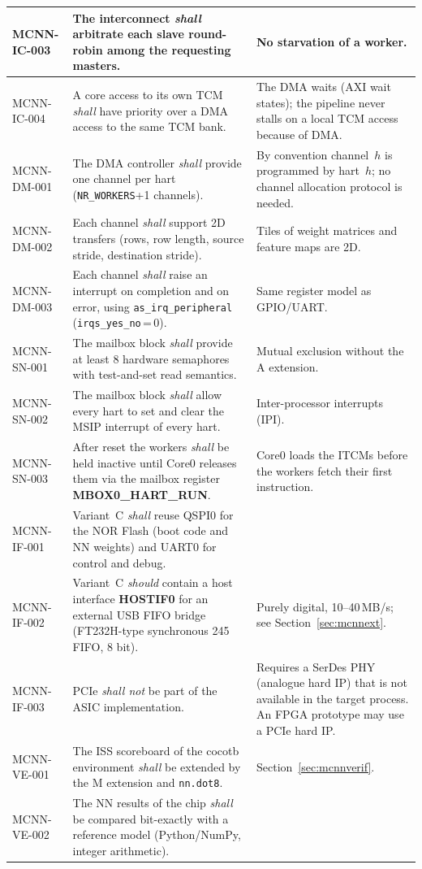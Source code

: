 \begin{longtable}{|p{} |p{} |p{}|}
  \hline
  MCNN-IC-003 &
    The interconnect \textit{shall} arbitrate each slave round-robin among
    the requesting masters. &
    No starvation of a worker. \\
  \hline
  MCNN-IC-004 &
    A core access to its own TCM \textit{shall} have priority over a DMA
    access to the same TCM bank. &
    The DMA waits (AXI wait states); the pipeline never stalls on a local
    TCM access because of DMA. \\
  \hline
  MCNN-DM-001 &
    The DMA controller \textit{shall} provide one channel per hart
    (\texttt{NR\_WORKERS}+1 channels). &
    By convention channel~$h$ is programmed by hart~$h$; no channel
    allocation protocol is needed. \\
  \hline
  MCNN-DM-002 &
    Each channel \textit{shall} support 2D transfers (rows, row length,
    source stride, destination stride). &
    Tiles of weight matrices and feature maps are 2D. \\
  \hline
  MCNN-DM-003 &
    Each channel \textit{shall} raise an interrupt on completion and on
    error, using \texttt{as\_irq\_peripheral} (\texttt{irqs\_yes\_no}\,=\,0). &
    Same register model as GPIO/UART. \\
  \hline
  MCNN-SN-001 &
    The mailbox block \textit{shall} provide at least 8 hardware
    semaphores with test-and-set read semantics. &
    Mutual exclusion without the A extension. \\
  \hline
  MCNN-SN-002 &
    The mailbox block \textit{shall} allow every hart to set and clear the
    MSIP interrupt of every hart. &
    Inter-processor interrupts (IPI). \\
  \hline
  MCNN-SN-003 &
    After reset the workers \textit{shall} be held inactive until Core0
    releases them via the mailbox register \textbf{MBOX0\_HART\_RUN}. &
    Core0 loads the ITCMs before the workers fetch their first
    instruction. \\
  \hline
  MCNN-IF-001 &
    Variant~C \textit{shall} reuse QSPI0 for the NOR Flash (boot code and
    NN weights) and UART0 for control and debug. & \\
  \hline
  MCNN-IF-002 &
    Variant~C \textit{should} contain a host interface \textbf{HOSTIF0}
    for an external USB FIFO bridge
    (FT232H-type synchronous 245 FIFO, 8 bit). &
    Purely digital, 10--40\,MB/s; see Section~\ref{sec:mcnnext}. \\
  \hline
  MCNN-IF-003 &
    PCIe \textit{shall not} be part of the ASIC implementation. &
    Requires a SerDes PHY (analogue hard IP) that is not available in the
    target process. An FPGA prototype may use a PCIe hard IP. \\
  \hline
  MCNN-VE-001 &
    The ISS scoreboard of the cocotb environment \textit{shall} be extended
    by the M extension and \texttt{nn.dot8}. &
    Section~\ref{sec:mcnnverif}. \\
  \hline
  MCNN-VE-002 &
    The NN results of the chip \textit{shall} be compared bit-exactly with a
    reference model (Python/NumPy, integer arithmetic). & \\
  \hline
\end{longtable}

